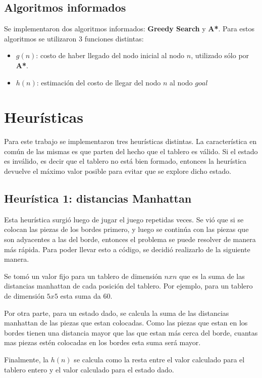 \documentclass[11pt,twocolumn]{article}
\begin{document}
    \subsection{Algoritmos informados}
    \par Se implementaron dos algoritmos informados: \textbf{Greedy Search} y \textbf{A*}. Para estos algoritmos se utilizaron 3 funciones distintas:
        \begin{itemize}
            \item $g(n)$: costo de haber llegado del nodo inicial al nodo $n$, utilizado sólo por \textbf{A*}.
            \item $h(n)$: estimación del costo de llegar del nodo $n$ al nodo $goal$
        \end{itemize}
\section{Heurísticas}
    \par Para este trabajo se implementaron tres heurísticas distintas. La característica en común de las mismas es que parten del hecho que el tablero es válido. Si el estado es inválido, es decir que el tablero no está bien formado, entonces la heurística devuelve el máximo valor posible para evitar que se explore dicho estado.
    \subsection{Heurística 1: distancias Manhattan}
        \par Esta heurística surgió luego de jugar el juego repetidas veces. Se vió que si se colocan las piezas de los bordes primero, y luego se continúa con las piezas que son adyacentes a las del borde, entonces el problema se puede resolver de manera más rápida. Para poder llevar esto a código, se decidió realizarlo de la siguiente manera.
        \par Se tomó un valor fijo para un tablero de dimensión $n x n$ que es la suma de las distancias manhattan de cada posición del tablero. Por ejemplo, para un tablero de dimensión $5x5$ esta suma da 60.
        \par Por otra parte, para un estado dado, se calcula la suma de las distancias manhattan de las piezas que estan colocadas. Como las piezas que estan en los bordes tienen una distancia mayor que las que estan más cerca del borde, cuantas mas piezas estén colocadas en los bordes esta suma será mayor.
        \par Finalmente, la $h(n)$ se calcula como la resta entre el valor calculado para el tablero entero y el valor calculado para el estado dado.
\end{document}
